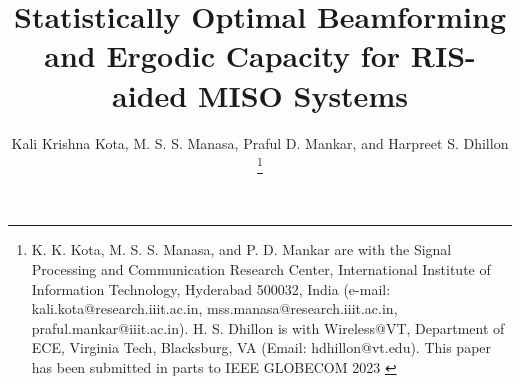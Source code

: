 \documentclass[journal,draftclsnofoot,onecolumn,12pt]{IEEEtran}
\begin{document}
%
\title{Statistically Optimal Beamforming and Ergodic Capacity for RIS-aided MISO  Systems}
%
%
%

\author{Kali Krishna Kota, M. S. S. Manasa,  %
        Praful D. Mankar, and Harpreet S. Dhillon%
\thanks{K. K. Kota, M. S. S. Manasa, and P. D. Mankar are with the Signal Processing and Communication Research Center, International Institute of Information Technology, Hyderabad 500032, India (e-mail: kali.kota@research.iiit.ac.in, mss.manasa@research.iiit.ac.in, praful.mankar@iiit.ac.in). H. S. Dhillon is with Wireless@VT, Department of ECE, Virginia Tech, Blacksburg, VA (Email:  hdhillon@vt.edu). This paper has been submitted in parts to IEEE GLOBECOM 2023 \cite{kota2022optimal}}}%

% 
%
\end{document}
